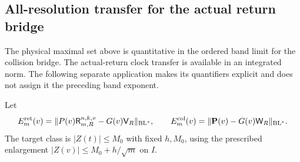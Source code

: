 \subsection{All-resolution transfer for the actual return bridge}
The physical maximal set above is quantitative in the ordered band
limit for the collision bridge. The actual-return clock transfer is
available in an integrated norm. The following separate application
makes its quantifiers explicit and does not assign it the preceding
band exponent.

Let
\[
 E_m^{\rm ret}(v)=
 \|P(v)\mathsf R^{n,k,v}_{m,R}-G(v)\mathsf V_R\|_{\mathrm{BL}^*},
 \qquad E_m^{\rm col}(v)=
 \|\mathbf P(v)-G(v)\mathsf W_R\|_{\mathrm{BL}^*}.
\]
The target class is $|Z(t)|\le M_0$ with fixed $h,M_0$, using the
prescribed enlargement $|Z(v)|\le M_0+h/\sqrt m$ on $I$.

